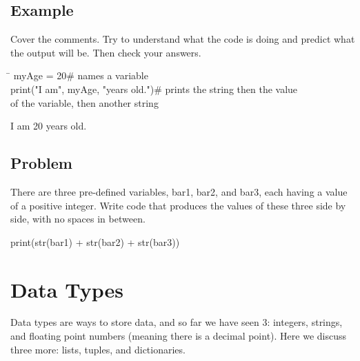 \documentclass{article}
\newenvironment{code}{\begin{tcolorbox}\ttfamily}{\end{tcolorbox}}
\newenvironment{out}{\begin{tcolorbox}[colback=output]\ttfamily}{\end{tcolorbox}}
\begin{document}
\subsection{Example}
\noindent Cover the comments. Try to understand what the code is doing and predict what the output will be. Then check your answers.
\vspace{1 mm}
\begin{tcolorbox}
	\ttfamily
	\begin{tabbing}
		\hspace{3.25 in}\=\hspace{3.25 in} \kill
		myAge = 20\>\# names a variable\\
		print("I am", myAge, "years old.")\>\# prints the string then the value \\
		\>\hspace{4 pt} of the variable, then another string
	\end{tabbing}
\end{tcolorbox}
\begin{tcolorbox}[colback=output]
	\ttfamily I am 20 years old.
\end{tcolorbox}
\subsection{Problem}
\noindent There are three pre-defined variables, bar1, bar2, and bar3, each having a value of a positive integer. Write code that produces the values of these three side by side, with no spaces in between.
\vspace{1 mm}
\begin{code}
print(str(bar1) + str(bar2) + str(bar3))
\end{code}
\begin{out}
378393
\end{out}
\section{Data Types}
Data types are ways to store data, and so far we have seen 3: integers, strings, and floating point numbers (meaning there is a decimal point). Here we discuss three more: lists, tuples, and dictionaries.
\end{document}
